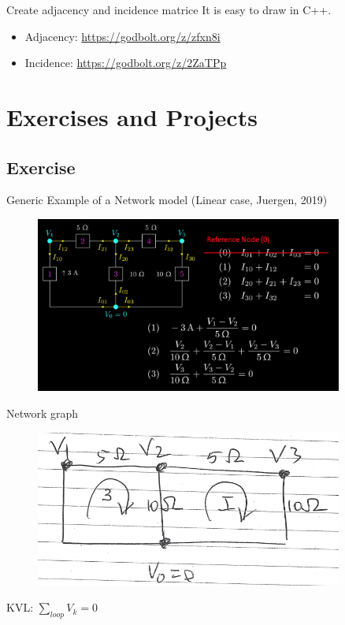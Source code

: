 \documentclass[xcolor=dvipsnames]{beamer}
\begin{document}
\begin{frame}{Create adjacency and incidence matrice}
It is easy to draw in C++.
	\begin{itemize}
		\item Adjacency: \url{https://godbolt.org/z/zfxn8i}
		\item Incidence: \url{https://godbolt.org/z/2ZaTPp}

	\end{itemize}
\end{frame}


\section{Exercises and Projects}
\subsection{Exercise}
\begin{frame}{Generic Example of a Network model (Linear case, Juergen, 2019)}
     	     \begin{figure}[!ht]
  			\centering
    		\includegraphics[width=0.9\textwidth]{slide31.png}
    		\label{fig:juergen1}
    	 \end{figure}
\end{frame}

\begin{frame}{Network graph}
     	 \begin{figure}[!ht]
  			\centering
    		\includegraphics[width=0.9\textwidth]{circuitj.png}
    		\label{fig:juergen2}
    	 \end{figure}	
KVL: 	$\sum_{loop} V_k = 0$
\end{frame}
\end{document}
